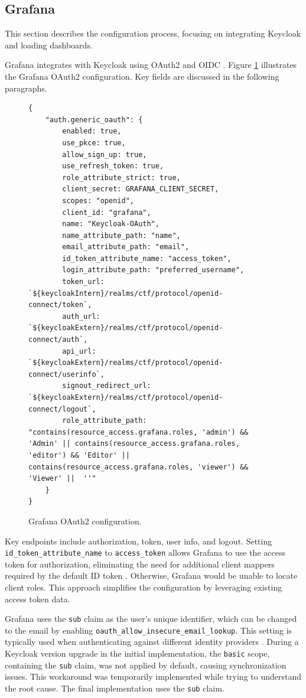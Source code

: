 \subsection{Grafana}
This section describes the configuration process, focusing on integrating Keycloak and loading dashboards.

Grafana integrates with Keycloak using OAuth2 and OIDC \parencite{GrafanaKeycloak}. Figure \ref{fig:grafana_oauth} illustrates the Grafana OAuth2 configuration. Key fields are discussed in the following paragraphs.

\begin{figure}[h]
    \centering
\begin{verbatim}
{
    "auth.generic_oauth": {
        enabled: true,
        use_pkce: true,
        allow_sign_up: true,
        use_refresh_token: true,
        role_attribute_strict: true,
        client_secret: GRAFANA_CLIENT_SECRET,
        scopes: "openid",
        client_id: "grafana",
        name: "Keycloak-OAuth",
        name_attribute_path: "name",
        email_attribute_path: "email",
        id_token_attribute_name: "access_token",
        login_attribute_path: "preferred_username",
        token_url: `${keycloakIntern}/realms/ctf/protocol/openid-connect/token`,
        auth_url: `${keycloakExtern}/realms/ctf/protocol/openid-connect/auth`,
        api_url: `${keycloakExtern}/realms/ctf/protocol/openid-connect/userinfo`,
        signout_redirect_url: `${keycloakExtern}/realms/ctf/protocol/openid-connect/logout`,
        role_attribute_path: "contains(resource_access.grafana.roles, 'admin') && 'Admin' || contains(resource_access.grafana.roles, 'editor') && 'Editor' || contains(resource_access.grafana.roles, 'viewer') && 'Viewer' ||  ''"
    }
}
\end{verbatim}
    \caption{Grafana OAuth2 configuration.}
    \label{fig:grafana_oauth}
\end{figure}

Key endpoints include authorization, token, user info, and logout. Setting \texttt{id\_token\_attribute\_name} to \texttt{access\_token} allows Grafana to use the access token for authorization, eliminating the need for additional client mappers required by the default ID token \parencite{grafana_oauth}. Otherwise, Grafana would be unable to locate client roles. This approach simplifies the configuration by leveraging existing access token data.

Grafana uses the \texttt{sub} claim as the user's unique identifier, which can be changed to the email by enabling \texttt{oauth\_allow\_insecure\_email\_lookup}. This setting is typically used when authenticating against different identity providers \parencite{grafana_authentication}. During a Keycloak version upgrade in the initial implementation, the \texttt{basic} scope, containing the \texttt{sub} claim, was not applied by default, causing synchronization issues. This workaround was temporarily implemented while trying to understand the root cause. The final implementation uses the \texttt{sub} claim.

